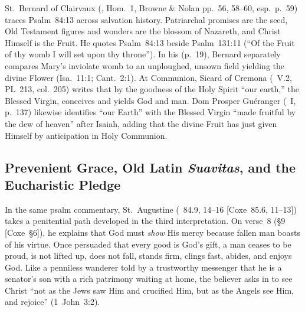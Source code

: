 St.~Bernard of Clairvaux (, Hom.~1, Browne \& Nolan pp.~56, 58--60, esp.~p.~59) traces Psalm~84:13 across salvation history. Patriarchal promises are the seed, Old Testament figures and wonders are the blossom of Nazareth, and Christ Himself is the Fruit. He quotes Psalm~84:13 beside Psalm~131:11 (``Of the Fruit of thy womb I will set upon thy throne''). In his  (p.~19), Bernard separately compares Mary's inviolate womb to an unploughed, unsown field yielding the divine Flower (Isa.~11:1; Cant.~2:1). At Communion, Sicard of Cremona (~V.2, PL~213, col.~205) writes that by the goodness of the Holy Spirit ``our earth,'' the Blessed Virgin, conceives and yields God and man. Dom Prosper Gu\'eranger (~I, p.~137) likewise identifies ``our Earth'' with the Blessed Virgin ``made fruitful by the dew of heaven'' after Isaiah, adding that the divine Fruit has just given Himself by anticipation in Holy Communion.

\subsection{Prevenient Grace, Old Latin \textit{Suavitas}, and the Eucharistic Pledge}

In the same psalm commentary, St.~Augustine (~84.9, 14--16 [Coxe~85.6, 11--13]) takes a penitential path developed in the third interpretation. On verse~8 (\S9 [Coxe~\S6]), he explains that God must \emph{show} His mercy because fallen man boasts of his virtue. Once persuaded that every good is God's gift, a man ceases to be proud, is not lifted up, does not fall, stands firm, clings fast, abides, and enjoys God. Like a penniless wanderer told by a trustworthy messenger that he is a senator's son with a rich patrimony waiting at home, the believer asks in  to see Christ ``not as the Jews saw Him and crucified Him, but as the Angels see Him, and rejoice'' (1~John~3:2).

